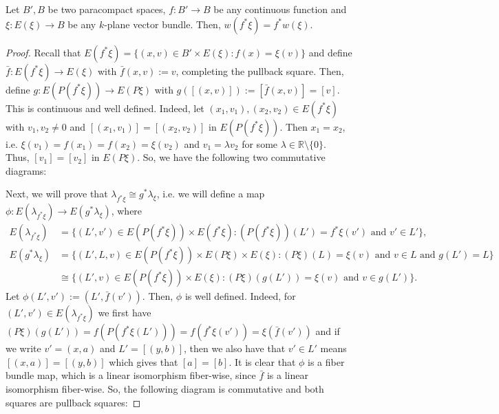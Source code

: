 \begin{proposition} Let $B',B$ be two paracompact spaces, $f:B'\to B$ be any continuous function and $\xi:E(\xi)\to B$ be any $k$-plane vector bundle. Then, $w(f^*\xi)=f^*w(\xi)$.
\end{proposition}
\begin{proof} Recall that $E(f^*\xi)=\big\{(x,v)\in B'\times E(\xi):f(x)=\xi(v)\big\}$ and define $\bar{f}:E(f^*\xi)\to E(\xi)$ with $\bar{f}(x,v):=v$, completing the pullback square. Then, define $g:E(P(f^*\xi))\to E(P\xi)$ with $g([(x,v)]):=[\bar{f}(x,v)]=[v]$. This is continuous and well defined. Indeed, let $(x_1,v_1),(x_2,v_2)\in E(f^*\xi)$ with $v_1,v_2\neq 0$ and $[(x_1,v_1)]=[(x_2,v_2)]$ in $E(P(f^*\xi))$. Then $x_1=x_2$, i.e. $\xi(v_1)=f(x_1)=f(x_2)=\xi(v_2)$ and $v_1=\lambda v_2$ for some $\lambda\in\mathbb{R}\setminus\{0\}$. Thus, $[v_1]=[v_2]$ in $E(P\xi)$. So, we have the following two commutative diagrams:
\begin{center}
\end{center}
Next, we will prove that $\lambda_{f^*\xi}\cong g^*\lambda_{\xi}$, i.e. we will define a map $\phi:E(\lambda_{f^*\xi})\to E(g^*\lambda_{\xi})$, where
\begin{align*}
E(\lambda_{f^*\xi})&=\big\{(L',v')\in E(P(f^*\xi))\times E(f^*\xi):(P(f^*\xi))(L')=f^*\xi(v')\text{ and }v'\in L'\big\},\\
E(g^*\lambda_{\xi})&=\big\{(L',L,v)\in E(P(f^*\xi))\times E(P\xi)\times E(\xi):(P\xi)(L)=\xi(v)\text{ and }v\in L\text{ and }g(L')=L\big\}\\
&\cong\big\{(L',v)\in E(P(f^*\xi))\times E(\xi):(P\xi)(g(L'))=\xi(v)\text{ and }v\in g(L')\big\}.
\end{align*}
Let $\phi(L',v'):=(L',\bar{f}(v'))$. Then, $\phi$ is well defined. Indeed, for $(L',v')\in E(\lambda_{f^*\xi})$ we first have $(P\xi)(g(L'))=f(P(f^*\xi(L')))=f(f^*\xi(v'))=\xi(\bar{f}(v'))$ and if we write $v'=(x,a)$ and $L'=[(y,b)]$, then we also have that $v'\in L'$ means $[(x,a)]=[(y,b)]$ which gives that $[a]=[b]$. It is clear that $\phi$ is a fiber bundle map, which is a linear isomorphism fiber-wise, since $\bar{f}$ is a linear isomorphism fiber-wise. So, the following diagram is commutative and both squares are pullback squares:

\end{proof}
